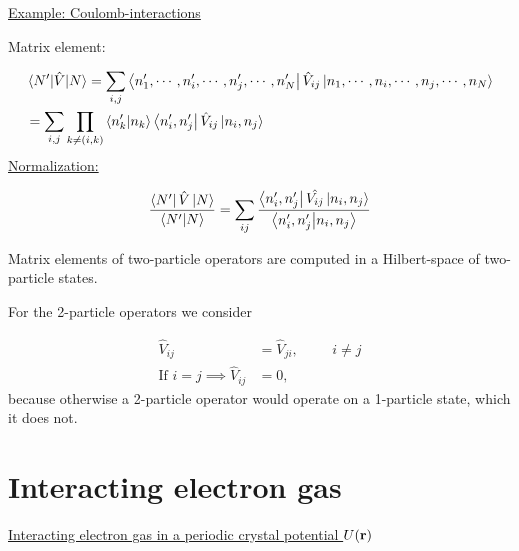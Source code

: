 \noindent \uline{Example: Coulomb-interactions}

\noindent Matrix element:

\begin{align}
	&\mel{N'}{\hat{V}}{N}
	= \sum_{i,j} \bra{n'_1, \cdots , n'_i, \cdots, n'_j, \cdots, n'_N} \hat{V}_{ij} \ket{n_1, \cdots , n_i, \cdots, n_j, \cdots, n_N}\\
	&= \sum_{i,j} \prod_{k\neq (i,k)} \braket{n'_k}{n_k} \bra{n'_i, n'_j} \hat{V}_{ij} \ket{n_i, n_j}
\end{align}
\noindent \uline{Normalization:}

\begin{equation}
	\frac{\bra{N'} \hat{V} \ket{N}}{\braket{N'}{N}} = \sum_{ij} \frac{\bra{n'_i, n'_j}\hat{V_{ij}}\ket{n_i, n_j}}{\braket{n'_i,n'_j}{n_i,n_j}}
\end{equation}

\begin{tcolorbox}
	Matrix elements of two-particle operators are computed in a Hilbert-space of two-particle states.
\end{tcolorbox}

\noindent For the 2-particle operators we consider

\begin{align}
	\hat{V}_{ij} &= \hat{V}_{ji}, \hspace{1cm} i \neq j\\
	\text{If } i=j \implies \hat{V}_{ij} &=0, \nonumber 
\end{align}
because otherwise a 2-particle operator would operate on a 1-particle state, which it does not.\\
\linebreak

\section{Interacting electron gas}
\noindent \uline{Interacting electron gas in a periodic crystal potential $U(\vb{r})$}

\begin{figure}
    \centering
{}
\end{figure}

